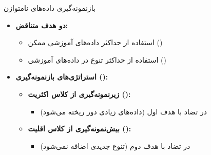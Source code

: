 \begin{frame}{بازنمونه‌گیری داده‌های نامتوازن}
\begin{itemize}
  \item \textbf{دو هدف متناقض:}
  \begin{itemize}
    \item استفاده از حداکثر داده‌های آموزشی ممکن ()
    \item استفاده از حداکثر تنوع در داده‌های آموزشی ()
  \end{itemize}
  \vspace{0.4cm}
  \item \textbf{استراتژی‌های بازنمونه‌گیری ():}
  \begin{itemize}
    \item \textbf{زیرنمونه‌گیری از کلاس اکثریت ():}
    \begin{itemize}
      \item در تضاد با هدف اول (داده‌های زیادی دور ریخته می‌شود)
    \end{itemize}
    \vspace{0.2cm}
    \item \textbf{بیش‌نمونه‌گیری از کلاس اقلیت ():}
    \begin{itemize}
      \item در تضاد با هدف دوم (تنوع جدیدی اضافه نمی‌شود)
    \end{itemize}
  \end{itemize}
\end{itemize}
\end{frame}

